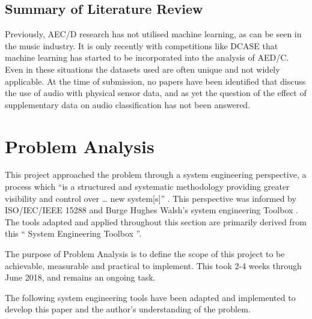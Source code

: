 \documentclass{UoNMCHA}
\newcommand{\inlineQuote}[1]{`` #1 ''}
\numberwithin{equation}{section}
\begin{document}
\subsection{Summary of Literature Review}

Previously, AEC/D research has not utilised machine learning, as can be seen in the music industry. It is only recently with competitions like DCASE that machine learning has started to be incorporated into the analysis of AED/C. Even in these situations the datasets used are often unique and not widely applicable. At the time of submission, no papers have been identified that discuss the use of audio with physical sensor data, and as yet the question of the effect of supplementary data on audio classification has not been answered.


\clearpage \section{Problem Analysis}\label{sec:ProblemAnalysis}

This project approached the problem through a system engineering perspective, a process which “is a structured and systematic methodology providing greater visibility and control over … new system[s]” \cite{limited2018systems}. This perspective was informed by ISO/IEC/IEEE 15288 \cite{IEEE15288} and Burge Hughes Walsh’s system engineering Toolbox \cite{SysThink2015}. The tools adapted and applied throughout this section are primarily derived from this \inlineQuote{System Engineering Toolbox}. 

The purpose of Problem Analysis is to define the scope of this project to be achievable, measurable and practical to implement. This took 2-4 weeks through June 2018, and remains an ongoing task. 

The following system engineering tools have been adapted and implemented to develop this paper and the author’s understanding of the problem. 
\end{document}
